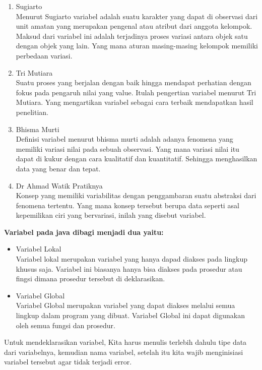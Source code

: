 \begin{enumerate}
    \item Sugiarto\\
Menurut Sugiarto variabel adalah suatu karakter yang dapat di observasi dari unit amatan yang merupakan pengenal atau atribut dari anggota kelompok. Maksud dari variabel ini adalah terjadinya proses variasi antara objek satu dengan objek yang lain. Yang mana aturan masing-masing kelompok memiliki perbedaan variasi.

    \item Tri Mutiara\\
Suatu proses yang berjalan dengan baik hingga mendapat perhatian dengan fokus pada pengaruh nilai yang value. Itulah pengertian variabel menurut Tri Mutiara. Yang mengartikan variabel sebagai cara terbaik mendapatkan hasil penelitian.

    \item Bhisma Murti\\
Definisi variabel menurut bhisma murti adalah adanya fenomena yang memiliki variasi nilai pada sebuah observasi. Yang mana variasi nilai itu dapat di kukur dengan cara kualitatif dan kuantitatif. Sehingga menghasilkan data yang benar dan tepat.

    \item Dr Ahmad Watik Pratiknya\\
Konsep yang memiliki variabilitas dengan penggambaran suatu abstraksi dari fenomena tertentu. Yang mana konsep tersebut berupa data seperti asal kepemilikan ciri yang bervariasi, inilah yang disebut variabel.
\end{enumerate}

\textbf{Variabel pada java dibagi menjadi dua yaitu:}
\begin{itemize}
    \item Variabel Lokal\\
    Variabel lokal merupakan variabel yang hanya dapad diakses pada lingkup khusus saja. Variabel ini biasanya hanya bisa diakses pada prosedur atau fingsi dimana prosedur tersebut di deklarasikan. 
    \item Variabel Global\\
    Variabel Global merupakan variabel yang dapat diakses melalui semua lingkup dalam program yang dibuat. Variabel Global ini dapat digunakan oleh semua fungsi dan prosedur.
\end{itemize}

Untuk mendeklarasikan variabel, Kita harus menulis terlebih dahulu tipe data dari variabelnya, kemudian nama variabel, setelah itu kita wajib menginisiasi variabel tersebut agar tidak terjadi error. 

